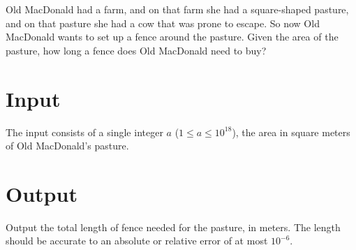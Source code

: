 
%
Old MacDonald had a farm, and on that farm she had a square-shaped
pasture, and on that pasture she had a cow that was prone to escape.
So now Old MacDonald wants to set up a fence around the pasture.  Given
the area of the pasture, how long a fence does Old MacDonald need to
buy?

\section*{Input}

The input consists of a single integer $a$ ($1 \le a \le 10^{18}$), the area in square meters of Old MacDonald's pasture.

\section*{Output}

Output the total length of fence needed for the pasture, in meters.
The length should be accurate to an absolute or relative error of at
most $10^{-6}$.
